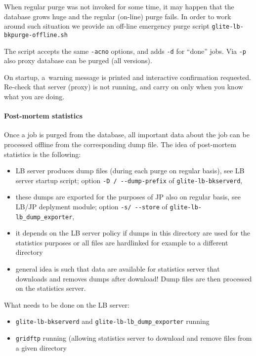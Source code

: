When regular purge was not invoked for some time, it may happen that 
the database grows huge and the regular (on-line) purge fails.
In order to work around such situation we provide an off-line emergency
purge script \verb'glite-lb-bkpurge-offline.sh'

The script accepts the same \verb'-acno' options, and adds \verb'-d' for ``done'' jobs. 
Via \verb'-p' also \LB proxy database can be purged (all \LB versions).

On startup, a~warning message is printed and interactive confirmation
requested.
Re-check that \LB server (proxy) is not running, and carry on only when you
know what you are doing.

\paragraph{Post-mortem statistics}

Once a job is purged from the database, all important data about the job can be
processed offline from the corresponding dump file. The idea of post-mortem
statistics is the following:

\begin{itemize}
\item LB server produces dump files (during each purge on regular basis),
see LB server startup script; option \verb'-D / --dump-prefix' of \verb'glite-lb-bkserverd',
\item these dumps are exported for the purposes of JP also on regular basis,
see LB/JP deplyment module; option \verb'-s/ --store' of \verb'glite-lb-lb_dump_exporter',
\item it depends on the LB server policy if dumps in this directory are used for
the statistics purposes or all files are hardlinked for example to a different
directory
\item general idea is such that data are available for statistics server that downloads
and removes dumps after download! Dump files are then processed on the statistics
server.
\end{itemize}

What needs to be done on the LB server:
\begin{itemize}
\item \verb'glite-lb-bkserverd' and \verb'glite-lb-lb_dump_exporter' running
\item \verb'gridftp' running (allowing statistics server to download and remove files from 
a given directory
\end{itemize}


